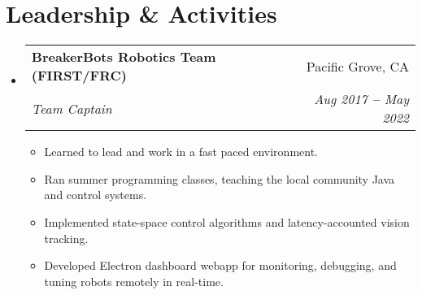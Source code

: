 \documentclass[12pt]{article}
\makeatletter
\newcommand{\entry}[1]{
  \item\small{
    {#1 \vspace{-2pt}}
  }
}
\newcommand{\subheading}[4]{
  \vspace{-2pt}\item
    \begin{tabular*}{0.97\textwidth}[t]{l@{\extracolsep{\fill}}r}
      \textbf{#1} & #2 \\
      \textit{\small#3} & \textit{\small #4} \\
    \end{tabular*}\vspace{-7pt}
}
\newcommand{\subheadingliststart}{\begin{itemize}[leftmargin=0.15in, label={}]}
\newcommand{\subheadinglistend}{\end{itemize}}
\newcommand{\entryliststart}{\begin{itemize}}
\newcommand{\entrylistend}{\end{itemize}\vspace{-5pt}}
\makeatother
\begin{document}
\section{Leadership \& Activities}
  \vspace{3pt}
  \subheadingliststart
    \subheading
      {BreakerBots Robotics Team (FIRST/FRC)}{Pacific Grove, CA}
      {Team Captain}{Aug 2017 \textbf{--} May 2022}
        \entryliststart
            \entry{Learned to lead and work in a fast paced environment.}
            \entry{Ran summer programming classes, teaching the local community Java and control systems.}
            \entry{Implemented state-space control algorithms and latency-accounted vision tracking.}
            \entry{Developed Electron dashboard webapp for monitoring, debugging, and tuning robots remotely in real-time.}
        \entrylistend
  \subheadinglistend
\end{document}
